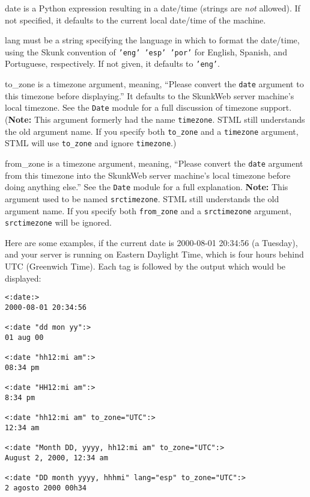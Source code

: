 \documentclass{manual}
\begin{document}
\begin{argdesc}
\item[date] is a Python expression resulting in a
date/time (strings are \emph{not} allowed). 
If not specified, it defaults to the current local date/time of the machine.

\item[lang] must be a string specifying the language in which
to format the date/time, using the Skunk convention of \texttt{'eng'
'esp' 'por'} for English, Spanish, and Portuguese, respectively.
If not given, it defaults to \texttt{'eng'}.

\item[to_zone] is a timezone argument, meaning, ``Please convert
the \texttt{date} argument to this timezone before displaying.'' It defaults
to the SkunkWeb server machine's local timezone. See the \texttt{Date} module
for a full discussion of timezone support. (\textbf{Note:} This argument
formerly had the name \texttt{timezone}. STML still understands the old argument
name. If you specify both \texttt{to_zone} and a \texttt{timezone} argument,
STML will use \texttt{to_zone} and ignore \texttt{timezone}.)

\item[from_zone] is a timezone argument, meaning, ``Please convert
the \texttt{date} argument from this timezone into the SkunkWeb server
machine's local timezone before doing anything else.'' See the
\texttt{Date} module for a full explanation. \textbf{Note:} This argument
used to be named \texttt{srctimezone}. STML still understands the old
argument name. If you specify both \texttt{from_zone} and a
\texttt{srctimezone} argument, \texttt{srctimezone} will be ignored.
\end{argdesc}

Here are some examples, if the current date is 2000-08-01 20:34:56
(a Tuesday), and your server is running on Eastern Daylight Time, which
is four hours behind UTC (Greenwich Time). Each tag is followed by
the output which would be displayed:

\begin{verbatim}
<:date:> 
2000-08-01 20:34:56

<:date "dd mon yy":>
01 aug 00

<:date "hh12:mi am":>  
08:34 pm

<:date "HH12:mi am":>  
8:34 pm

<:date "hh12:mi am" to_zone="UTC":>  
12:34 am

<:date "Month DD, yyyy, hh12:mi am" to_zone="UTC":>  
August 2, 2000, 12:34 am

<:date "DD month yyyy, hhhmi" lang="esp" to_zone="UTC":>  
2 agosto 2000 00h34
\end{verbatim}
\end{document}
